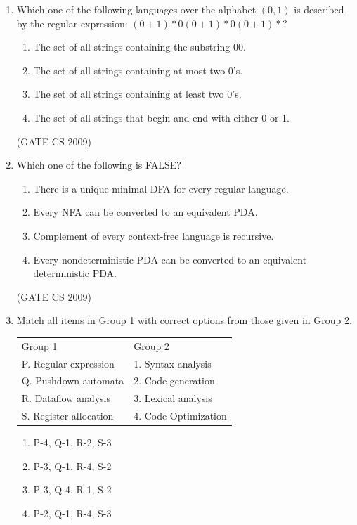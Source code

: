 \documentclass[a4paper, 11pt]{article}
\begin{document}
\begin{enumerate}
    \item Which one of the following languages over the alphabet $(0, 1)$ is described by the regular expression: $(0+1)*0(0+1)*0(0+1)*$?
    \begin{enumerate} 
        \item The set of all strings containing the substring 00. 
        \item The set of all strings containing at most two 0's.
        \item The set of all strings containing at least two 0's.
        \item The set of all strings that begin and end with either 0 or 1.
    \end{enumerate}

    \hfill (GATE CS 2009)

    \item Which one of the following is FALSE?
    \begin{enumerate} 
        \item There is a unique minimal DFA for every regular language.
        \item Every NFA can be converted to an equivalent PDA.
        \item Complement of every context-free language is recursive.
        \item Every nondeterministic PDA can be converted to an equivalent deterministic PDA.
    \end{enumerate}

    \hfill (GATE CS 2009)

    \item Match all items in Group 1 with correct options from those given in Group 2.\\
    \begin{tabular}{ll}
        Group 1 & Group 2 \\
        P. Regular expression & 1. Syntax analysis\\
        Q. Pushdown automata & 2. Code generation\\
        R. Dataflow analysis & 3. Lexical analysis \\
        S. Register allocation & 4. Code Optimization
    \end{tabular}
    
    \begin{enumerate} 
        \item P-4, Q-1, R-2, S-3
        \item P-3, Q-1, R-4, S-2 
        \item P-3, Q-4, R-1, S-2
        \item P-2, Q-1, R-4, S-3
    \end{enumerate}


\end{enumerate}
\end{document}
